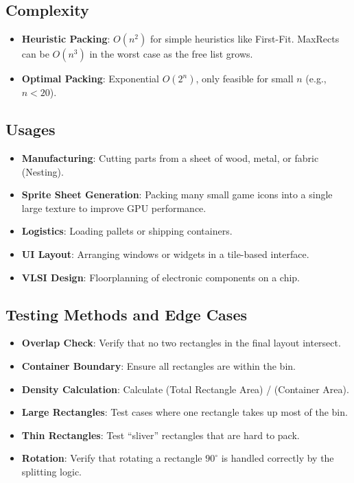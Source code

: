 \subsection{Complexity}
\begin{itemize}
    \item \textbf{Heuristic Packing}: $O(n^2)$ for simple heuristics like First-Fit. MaxRects can be $O(n^3)$ in the worst case as the free list grows.
    \item \textbf{Optimal Packing}: Exponential $O(2^n)$, only feasible for small $n$ (e.g., $n < 20$).
\end{itemize}

\subsection{Usages}
\begin{itemize}
    \item \textbf{Manufacturing}: Cutting parts from a sheet of wood, metal, or fabric (Nesting).
    \item \textbf{Sprite Sheet Generation}: Packing many small game icons into a single large texture to improve GPU performance.
    \item \textbf{Logistics}: Loading pallets or shipping containers.
    \item \textbf{UI Layout}: Arranging windows or widgets in a tile-based interface.
    \item \textbf{VLSI Design}: Floorplanning of electronic components on a chip.
\end{itemize}

\subsection{Testing Methods and Edge Cases}
\begin{itemize}
    \item \textbf{Overlap Check}: Verify that no two rectangles in the final layout intersect.
    \item \textbf{Container Boundary}: Ensure all rectangles are within the bin.
    \item \textbf{Density Calculation}: Calculate (Total Rectangle Area) / (Container Area).
    \item \textbf{Large Rectangles}: Test cases where one rectangle takes up most of the bin.
    \item \textbf{Thin Rectangles}: Test ``sliver'' rectangles that are hard to pack.
    \item \textbf{Rotation}: Verify that rotating a rectangle $90^\circ$ is handled correctly by the splitting logic.
\end{itemize}

